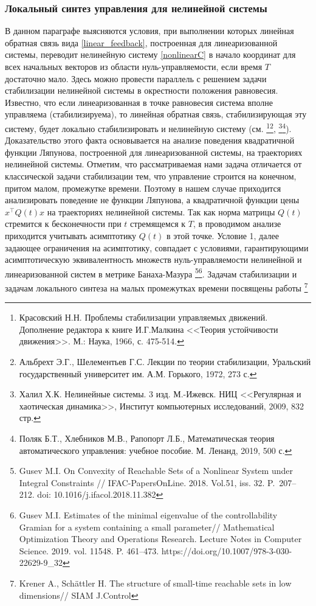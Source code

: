 \documentclass[../main.tex]{subfiles}
\begin{document}
	\subsubsection{Локальный синтез управления для нелинейной системы}
	
	В данном параграфе выясняются условия, при выполнении которых линейная обратная связь  вида \eqref{linear_feedback}, построенная для линеаризованной системы, переводит нелинейную систему \eqref{nonlinearC} в начало координат для всех начальных векторов из области нуль-управляемости, если время $T$ достаточно мало. Здесь можно провести параллель с  решением задачи стабилизации  нелинейной системы в окрестности положения равновесия.   Известно, что если линеаризованная в точке равновесия система  вполне управляема (стабилизируема), то линейная обратная связь, стабилизирующая эту систему, будет локально стабилизировать  и нелинейную систему  (см. \footnote{Красовский Н.Н. Проблемы стабилизации управляемых движений. Дополнение редактора к книге И.Г.Малкина <<Теория устойчивости  движения>>. М.: Наука, 1966, с. 475-514.}\footnote{Альбрехт Э.Г., Шелементьев Г.С. Лекции по теории стабилизации, Уральский государственный университет им. А.М. Горького, 1972, 273 с.}, \footnote{Халил Х.К. Нелинейные системы. 3 изд. М.-Ижевск. НИЦ <<Регулярная и хаотическая динамика>>, Институт компьютерных исследований, 2009, 832 стр.}\footnote{Поляк Б.Т., Хлебников М.В., Рапопорт Л.Б., Математическая теория автоматического управления: учебное пособие. М. Ленанд, 2019, 500 с.}). Доказательство этого факта основывается на анализе поведения квадратичной функции Ляпунова, построенной для линеаризованной системы, на траекториях нелинейной системы. Отметим, что рассматриваемая нами задача отличается от классической задачи стабилизации тем, что управление строится на конечном, притом малом, промежутке времени. Поэтому в нашем случае приходится анализировать поведение не функции Ляпунова, а квадратичной функции цены  $x^\top Q(t)x$ на траекториях нелинейной системы.  Так как норма матрицы $Q(t)$ стремится к бесконечности при $t$ стремящемся к $T$, в проводимом анализе приходится учитывать асимптотику $Q(t)$ в этой точке.  Условие 1, далее задающее ограничения на асимптотику, совпадает с условиями, гарантирующими асимптотическую эквивалентность множеств нуль-управляемости нелинейной и линеаризованной систем в метрике Банаха-Мазура  \footnote{Gusev M.I. On Convexity of Reachable Sets of a Nonlinear System under Integral Constraints // IFAC-PapersOnLine. 2018. Vol.51, iss. 32. P.~207--212. doi: 10.1016/j.ifacol.2018.11.382}\footnote{Gusev M.I. Estimates of the minimal eigenvalue of the controllability Gramian for a system containing a small parameter//  Mathematical Optimization Theory and Operations Research. Lecture Notes in Computer Science. 2019. vol. 11548. P. 461--473.  https://doi.org/10.1007/978-3-030-22629-9\_32}. Задачам стабилизации и задачам локального синтеза на малых промежутках времени посвящены работы \footnote{Krener A., Sch\"{a}ttler H. The structure of small-time reachable sets in low dimensions// SIAM J.Control
}
\end{document}
